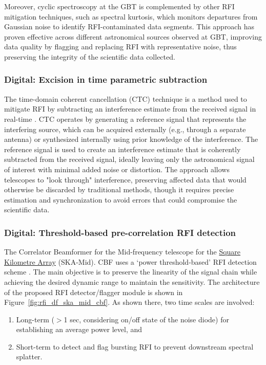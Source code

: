 Moreover, cyclic spectroscopy at the GBT is complemented by other RFI mitigation techniques, such as spectral kurtosis, which monitors departures from Gaussian noise to identify RFI-contaminated data segments. This approach has proven effective across different astronomical sources observed at GBT, improving data quality by flagging and replacing RFI with representative noise, thus preserving the integrity of the scientific data collected.

\subsubsection{Digital: Excision in time parametric subtraction}

The time-domain coherent cancellation (CTC) technique is a method used to mitigate RFI by subtracting an interference estimate from the received signal in real-time \citep{ellingson2022coherent}. CTC operates by generating a reference signal that represents the interfering source, which can be acquired externally (e.g., through a separate antenna) or synthesized internally using prior knowledge of the interference. The reference signal is used to create an interference estimate that is coherently subtracted from the received signal, ideally leaving only the astronomical signal of interest with minimal added noise or distortion. The approach allows telescopes to "look through" interference, preserving affected data that would otherwise be discarded by traditional methods, though it requires precise estimation and synchronization to avoid errors that could compromise the scientific data.

\subsubsection{Digital: Threshold-based pre-correlation RFI detection}
\label{subsection:hardware:catalog:ska-mid}

The Correlator Beamformer for the Mid-frequency telescope for the \href{https://www.skao.int/en}{Square Kilometre Array} (SKA-Mid). CBF uses a `power threshold-based' RFI detection scheme \citep{ska_mid_cbf_rfi_2019}. The main objective is to preserve the linearity of the signal chain while achieving the desired dynamic range to maintain the sensitivity. The architecture of the proposed RFI detector/flagger module is shown in Figure~\ref{fig:rfi_df_ska_mid_cbf}. As shown there, two time scales are involved:
\begin{enumerate}
    \item Long-term ($>$1 sec, considering on/off state of the noise diode) for establishing an average power level, and
    \item Short-term to detect and flag bursting RFI to prevent downstream spectral splatter.
\end{enumerate}

